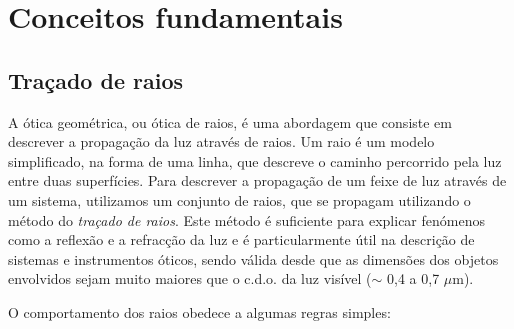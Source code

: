 \documentclass[12pt,a4paper,oneside]{paper}
\begin{document}
\pagestyle{fancy}
\fancyhf{} %

%
% 



\def\title {}


%
% 

 
\normalsize
\cleardoublepage
\setcounter{page}{1}
\selectfont
%
%

\printindex


\section{\sf Conceitos fundamentais}
\subsection{\sf Traçado de raios}
A ótica geométrica, ou ótica de raios, é uma abordagem que consiste em descrever a propagação da luz através de raios.
Um raio é um modelo simplificado, na forma de uma linha, que descreve o caminho percorrido pela luz entre duas superfícies.
Para descrever a propagação de um feixe de luz através de um sistema, utilizamos um conjunto de raios, que se propagam utilizando
o método do \emph{traçado de raios}.
Este método é suficiente para explicar fenómenos como a reflexão e a refracção da luz e é particularmente útil na descrição
de sistemas e instrumentos óticos, sendo válida desde que as dimensões dos objetos envolvidos sejam muito maiores que o c.d.o.
da luz visível ($\sim$ 0,4 a 0,7 $\mu$m).

O comportamento dos raios obedece a algumas regras simples:
\end{document}
